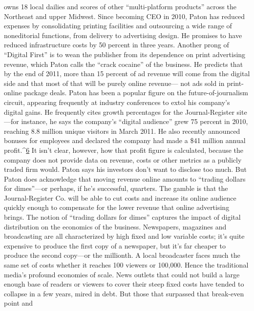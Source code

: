 owns 18 local dailies and scores of other ``multi-platform products'' across the
Northeast and upper Midwest. Since becoming CEO in 2010, Paton has reduced
expenses by consolidating printing facilities and outsourcing a wide range of
noneditorial functions, from delivery to advertising design. He promises to have
reduced infrastructure costs by 50 percent in three years.
Another prong of ``Digital First'' is to wean the publisher from its dependence
on print advertising revenue, which Paton calls the ``crack cocaine'' of the business.
He predicts that by the end of 2011, more than 15 percent of ad revenue
will come from the digital side and that most of that will be purely online revenue—
not ads sold in print-online package deals.
Paton has been a popular figure on the future-of-journalism circuit, appearing
frequently at industry conferences to extol his company’s digital gains. He
frequently cites growth percentages for the Journal-Register site—for instance,
he says the company’s ``digital audience'' grew 75 percent in 2010, reaching 8.8
million unique visitors in March 2011. He also recently announced bonuses for
employees and declared the company had made a \$41 million annual profit.^{\href{#endnotes-ch7}{6}} It
isn’t clear, however, how that profit figure is calculated, because the company
does not provide data on revenue, costs or other metrics as a publicly traded firm
would. Paton says his investors don’t want to disclose too much.
But Paton does acknowledge that moving revenue online amounts to ``trading
dollars for dimes''—or perhaps, if he’s successful, quarters. The gamble is
that the Journal-Register Co. will be able to cut costs and increase its online
audience quickly enough to compensate for the lower revenue that online
advertising brings.
The notion of ``trading dollars for dimes'' captures the impact of digital distribution
on the economics of the business. Newspapers, magazines and broadcasting
are all characterized by high fixed and low variable costs; it’s quite expensive
to produce the first copy of a newspaper, but it’s far cheaper to produce the
second copy—or the millionth. A local broadcaster faces much the same set of
costs whether it reaches 100 viewers or 100,000. Hence the traditional media’s
profound economies of scale. News outlets that could not build a large enough
base of readers or viewers to cover their steep fixed costs have tended to collapse
in a few years, mired in debt. But those that surpassed that break-even point and
